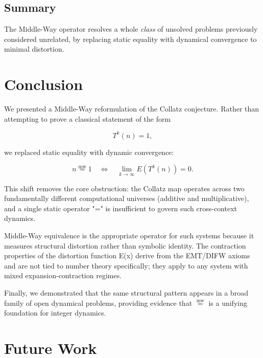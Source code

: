 \documentclass[11pt]{article}
\newcommand{\mweq}{\mathrel{\overset{\mathrm{mw}}{=}}}
\theoremstyle{definition}
\theoremstyle{remark}
\begin{document}
\subsection{Summary}

The Middle-Way operator resolves a whole \emph{class} of unsolved
problems previously considered unrelated, by replacing static equality
with dynamical convergence to minimal distortion.


\section{Conclusion}

We presented a Middle-Way reformulation of the Collatz conjecture.
Rather than attempting to prove a classical statement of the form

\[
  T^{k}(n) = 1,
\]

we replaced static equality with dynamic convergence:

\[
  n \mweq 1 \quad \Longleftrightarrow \quad
  \lim_{k \to \infty} E(T^{k}(n)) = 0.
\]

This shift removes the core obstruction: the Collatz map operates across
two fundamentally different computational universes (additive and
multiplicative), and a single static operator "=" is insufficient to
govern such cross-context dynamics.

Middle-Way equivalence is the appropriate operator for such systems
because it measures structural distortion rather than symbolic identity.
The contraction properties of the distortion function E(x) derive from
the EMT/DIFW axioms and are not tied to number theory specifically;
they apply to any system with mixed expansion-contraction regimes.

Finally, we demonstrated that the same structural pattern appears in a
broad family of open dynamical problems, providing evidence that $\mweq$ is
a unifying foundation for integer dynamics.

\section{Future Work}
\end{document}
